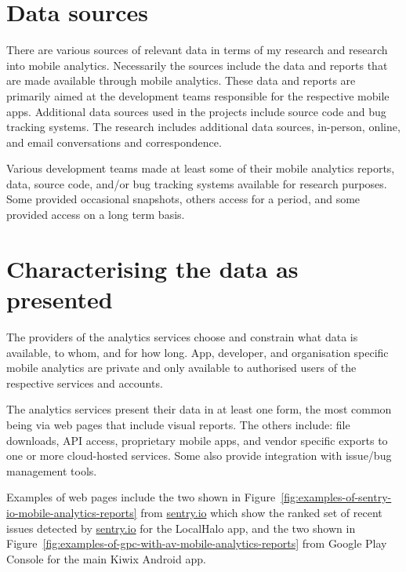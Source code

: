 \section{Data sources}
\label{section-case-studies-data-sources}

There are various sources of relevant data in terms of my research and research into mobile analytics. Necessarily the sources include the data and reports that are made available through mobile analytics. These data and reports are primarily aimed at the development teams responsible for the respective mobile apps. Additional data sources used in the projects include source code and bug tracking systems. The research includes additional data sources, in-person, online, and email conversations and correspondence.  

Various development teams made at least some of their mobile analytics reports, data, source code, and/or bug tracking systems available for research purposes. Some provided occasional snapshots, others access for a period, and some provided access on a long term basis.

\section{Characterising the data as presented}
The providers of the analytics services choose and constrain what data is available, to whom, and for how long. App, developer, and organisation specific mobile analytics are private and only available to authorised users of the respective services and accounts.

The analytics services present their data in at least one form, the most common being via web pages that include visual reports. The others include: file downloads, API access, proprietary mobile apps, and vendor specific exports to one or more cloud-hosted services. Some also provide integration with issue/bug management tools.

Examples of web pages include the two shown in Figure~\ref{fig:examples-of-sentry-io-mobile-analytics-reports} from \href{https://sentry.io/}{sentry.io} which show the ranked set of recent issues detected by \href{https://sentry.io/}{sentry.io} for the LocalHalo app, and the two shown in Figure~\ref{fig:examples-of-gpc-with-av-mobile-analytics-reports} from Google Play Console for the main Kiwix Android app. 

